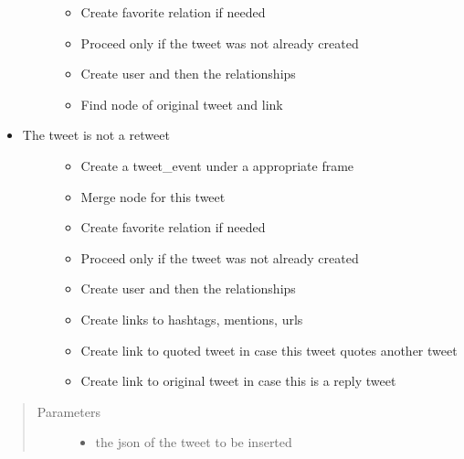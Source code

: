 \documentclass[letterpaper,10pt,english]{sphinxmanual}
\begin{document}
\begin{fulllineitems}
\begin{fulllineitems}
\begin{itemize}
\begin{description}
\begin{itemize}
\item {} 
Create favorite relation if needed

\item {} 
Proceed only if the tweet was not already created

\item {} 
Create user and then the relationships

\item {} 
Find node of original tweet and link

\end{itemize}

\end{description}

\item {} \begin{description}
\item[{The tweet is not a retweet}] \leavevmode\begin{itemize}
\item {} 
Create a tweet\_event under a appropriate frame

\item {} 
Merge node for this tweet

\item {} 
Create favorite relation if needed

\item {} 
Proceed only if the tweet was not already created

\item {} 
Create user and then the relationships

\item {} 
Create links to hashtags, mentions, urls

\item {} 
Create link to quoted tweet in case this tweet quotes another tweet

\item {} 
Create link to original tweet in case this is a reply tweet

\end{itemize}

\end{description}

\end{itemize}
\begin{quote}\begin{description}
\item[{Parameters}] \leavevmode\begin{itemize}
\item {} 
 \textendash{} the json of the tweet to be inserted


\end{itemize}
\end{description}
\end{quote}
\end{fulllineitems}
\end{fulllineitems}
\end{document}
